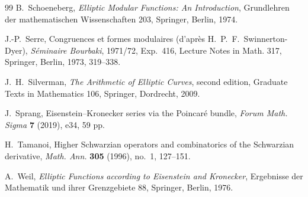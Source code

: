 \documentclass[11pt]{amsart}
\theoremstyle{definition}
\theoremstyle{remark}
\numberwithin{equation}{section}
\begin{document}
\begin{thebibliography}{99}
B.~Schoeneberg,
\emph{Elliptic Modular Functions: An Introduction},
Grundlehren der mathematischen Wissenschaften 203,
Springer, Berlin, 1974.

J.-P.~Serre,
Congruences et formes modulaires (d'apr\`es H.~P.~F.~Swinnerton-Dyer),
\emph{S\'eminaire Bourbaki}, 1971/72, Exp.~416,
Lecture Notes in Math. 317, Springer, Berlin, 1973, 319--338.

J.~H.~Silverman,
\emph{The Arithmetic of Elliptic Curves},
second edition, Graduate Texts in Mathematics 106,
Springer, Dordrecht, 2009.

J.~Sprang,
Eisenstein--Kronecker series via the Poincar\'e bundle,
\emph{Forum Math. Sigma} \textbf{7} (2019), e34, 59 pp.

H.~Tamanoi,
Higher Schwarzian operators and combinatorics of the Schwarzian derivative,
\emph{Math. Ann.} \textbf{305} (1996), no.~1, 127--151.

A.~Weil,
\emph{Elliptic Functions according to Eisenstein and Kronecker},
Ergebnisse der Mathematik und ihrer Grenzgebiete 88,
Springer, Berlin, 1976.

\end{thebibliography}
\end{document}
